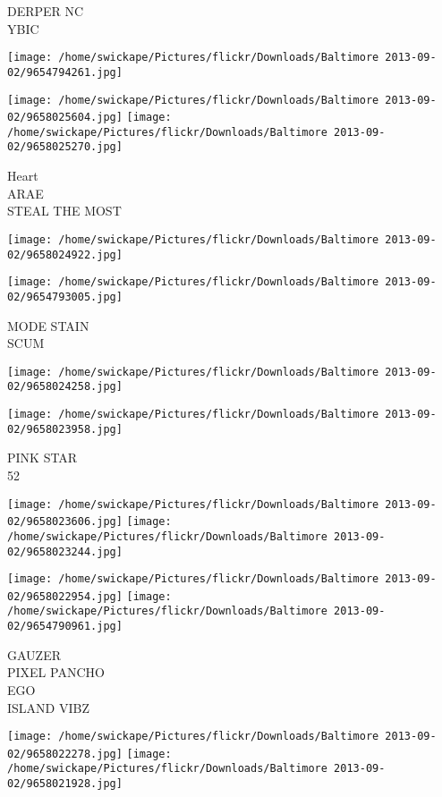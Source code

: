 \documentclass[10pt,letterpaper]{article}
\begin{document}
DERPER NC\\
YBIC
\pagebreak

\texttt{[image: /home/swickape/Pictures/flickr/Downloads/Baltimore 2013-09-02/9654794261.jpg]}

\vspace{0.25in}
\texttt{[image: /home/swickape/Pictures/flickr/Downloads/Baltimore 2013-09-02/9658025604.jpg]}
\texttt{[image: /home/swickape/Pictures/flickr/Downloads/Baltimore 2013-09-02/9658025270.jpg]}

Heart\\
ARAE\\
STEAL THE MOST
\pagebreak

\texttt{[image: /home/swickape/Pictures/flickr/Downloads/Baltimore 2013-09-02/9658024922.jpg]}

\vspace{0.25in}
\texttt{[image: /home/swickape/Pictures/flickr/Downloads/Baltimore 2013-09-02/9654793005.jpg]}

MODE STAIN\\
SCUM
\pagebreak

\texttt{[image: /home/swickape/Pictures/flickr/Downloads/Baltimore 2013-09-02/9658024258.jpg]}

\vspace{0.25in}
\texttt{[image: /home/swickape/Pictures/flickr/Downloads/Baltimore 2013-09-02/9658023958.jpg]}

PINK STAR\\
52
\pagebreak

\texttt{[image: /home/swickape/Pictures/flickr/Downloads/Baltimore 2013-09-02/9658023606.jpg]}
\texttt{[image: /home/swickape/Pictures/flickr/Downloads/Baltimore 2013-09-02/9658023244.jpg]}

\texttt{[image: /home/swickape/Pictures/flickr/Downloads/Baltimore 2013-09-02/9658022954.jpg]}
\texttt{[image: /home/swickape/Pictures/flickr/Downloads/Baltimore 2013-09-02/9654790961.jpg]}

GAUZER\\
PIXEL PANCHO\\
EGO\\
ISLAND VIBZ
\pagebreak

\texttt{[image: /home/swickape/Pictures/flickr/Downloads/Baltimore 2013-09-02/9658022278.jpg]}
\texttt{[image: /home/swickape/Pictures/flickr/Downloads/Baltimore 2013-09-02/9658021928.jpg]}
\end{document}
